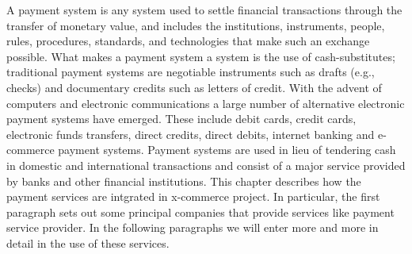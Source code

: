 A payment system is any system used to settle financial transactions through the transfer of monetary value, and includes the institutions, instruments, people, rules, procedures, standards, and technologies that make such an exchange possible.
\newline
What makes a payment system a system is the use of cash-substitutes; traditional payment systems are negotiable instruments such as drafts (e.g., checks) and documentary credits such as letters of credit. With the advent of computers and electronic communications a large number of alternative electronic payment systems have emerged. These include debit cards, credit cards, electronic funds transfers, direct credits, direct debits, internet banking and e-commerce payment systems.
\newline
Payment systems are used in lieu of tendering cash in domestic and international transactions and consist of a major service provided by banks and other financial institutions.
\newline
This chapter describes how the payment services are intgrated in x-commerce project. In particular, the first paragraph sets out some principal companies that provide services like payment service provider. In the following paragraphs we will enter more and more in detail in the use of these services.
